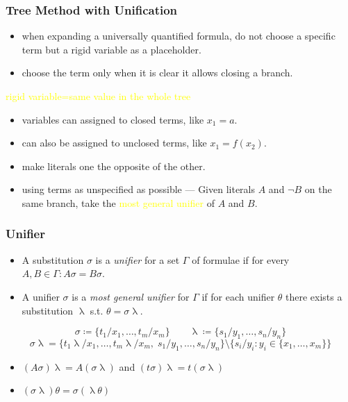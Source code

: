 \documentclass[UTF8,11pt,colorlinks,compress,openany]{beamer}%
\begin{document}
\begin{frame}\frametitle{Tree Method with Unification}
	\begin{itemize}
		\item when expanding a universally quantified formula, do not choose a specific term but a rigid variable as a placeholder.
		\item choose the term only when it is clear it allows closing a branch.
	\end{itemize}
	\begin{center}
		\textcolor{yellow}{rigid variable=same value in the whole tree}
	\end{center}
	\begin{itemize}
		\item variables can assigned to closed terms, like $x_1=a$.
		\item can also be assigned to unclosed terms, like $x_1=f(x_2)$.
	\end{itemize}
	\begin{itemize}
		\item make literals one the opposite of the other.
		\item using terms as unspecified as possible --- Given literals $A$ and $\neg B$ on the same branch, take the \textcolor{yellow}{most general unifier} of $A$ and $B$.
	\end{itemize}
\end{frame}

\begin{frame}\frametitle{Unifier}
\begin{block}{}
\begin{itemize}
\item A substitution $\sigma$ is a \emph{unifier} for a set $\Gamma$ of formulae if for every $A, B\in\Gamma: A\sigma=B\sigma$.
\item A unifier $\sigma$ is a \emph{most general unifier} for $\Gamma$ if for each unifier $\theta$ there exists a substitution $\uplambda$ s.t. $\theta=\sigma\uplambda$.
\end{itemize}
\end{block}
\[\sigma\coloneqq \{t_1/x_1,\dots,t_m/x_m\}\qquad \uplambda\coloneqq \{s_1/y_1,\dots,s_n/y_n\}\]
\[\sigma\uplambda=\big\{t_1\uplambda/x_1,\dots,t_m\uplambda/x_m,\; s_1/y_1,\dots,s_n/y_n\big\}\setminus\big\{s_i/y_i: y_i\in\{x_1,\dots,x_m\}\big\}\]
\begin{itemize}
	\item $(A\sigma)\uplambda=A(\sigma\uplambda)$ and $(t\sigma)\uplambda=t(\sigma\uplambda)$
	\item $(\sigma\uplambda)\theta=\sigma(\uplambda\theta)$
\end{itemize}
\end{frame}
\end{document}
